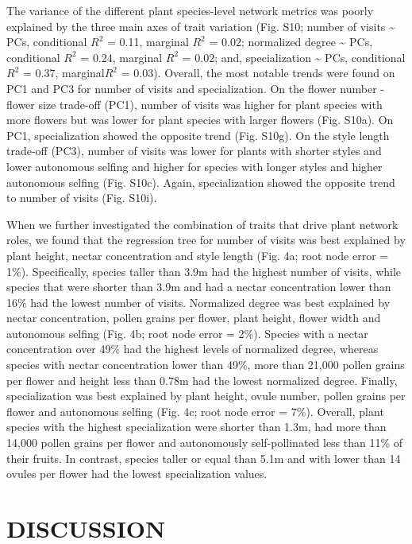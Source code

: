 \documentclass[
  12pt,
  a4paper,
]{article}
\begin{document}
The variance of the different plant species-level network metrics was poorly explained by the three main axes of trait variation (Fig. S10; number of visits \textasciitilde{} PCs, conditional \(R^{2}\) = 0.11, marginal \(R^{2}\) = 0.02; normalized degree \textasciitilde{} PCs, conditional \(R^{2}\) = 0.24, marginal \(R^{2}\) = 0.02; and, specialization \textasciitilde{} PCs, conditional \(R^{2}\) = 0.37, marginal\(R^{2}\) = 0.03). Overall, the most notable trends were found on PC1 and PC3 for number of visits and specialization. On the flower number - flower size trade-off (PC1), number of visits was higher for plant species with more flowers but was lower for plant species with larger flowers (Fig. S10a). On PC1, specialization showed the opposite trend (Fig. S10g). On the style length trade-off (PC3), number of visits was lower for plants with shorter styles and lower autonomous selfing and higher for species with longer styles and higher autonomous selfing (Fig. S10c). Again, specialization showed the opposite trend to number of visits (Fig. S10i).

When we further investigated the combination of traits that drive plant network roles, we found that the regression tree for number of visits was best explained by plant height, nectar concentration and style length (Fig. 4a; root node error = 1\%). Specifically, species taller than 3.9m had the highest number of visits, while species that were shorter than 3.9m and had a nectar concentration lower than 16\% had the lowest number of visits. Normalized degree was best explained by nectar concentration, pollen grains per flower, plant height, flower width and autonomous selfing (Fig. 4b; root node error = 2\%). Species with a nectar concentration over 49\% had the highest levels of normalized degree, whereas species with nectar concentration lower than 49\%, more than 21,000 pollen grains per flower and height less than 0.78m had the lowest normalized degree. Finally, specialization was best explained by plant height, ovule number, pollen grains per flower and autonomous selfing (Fig. 4c; root node error = 7\%). Overall, plant species with the highest specialization were shorter than 1.3m, had more than 14,000 pollen grains per flower and autonomously self-pollinated less than 11\% of their fruits. In contrast, species taller or equal than 5.1m and with lower than 14 ovules per flower had the lowest specialization values.

\hypertarget{discussion}{%
\section{DISCUSSION}\label{discussion}}
\end{document}
